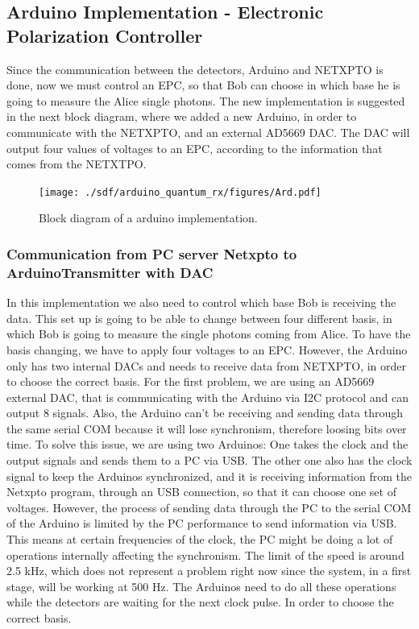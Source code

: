 \begin{refsection}
	
	\clearpage
	
	\subsection{Arduino Implementation - Electronic Polarization Controller }
	Since the communication between the detectors, Arduino and NETXPTO is done, now we must control an EPC, so that Bob can choose in which base he is going to measure the Alice single photons. The new implementation is suggested in the next block diagram, where we added a new Arduino, in order to communicate with the NETXPTO, and an external AD5669 DAC. The DAC will output four values of voltages to an EPC, according to the information that comes from the NETXTPO.
	
	\begin{figure}[H] 
		\centering
		\texttt{[image: ./sdf/arduino\_quantum\_rx/figures/Ard.pdf]}
		\caption{Block diagram of a arduino implementation.}
		\label{fig:netxpto}
		
	\end{figure}

	

	\subsubsection{Communication from PC server Netxpto to ArduinoTransmitter with DAC}
		In this implementation we also need to control which base Bob is receiving the data. This set up is going to be able to change between four different basis, in which Bob is going to measure the single photons coming from Alice. To have the basis changing, we have to apply four voltages to an EPC. However, the Arduino only has two internal DACs and needs to receive data from NETXPTO, in order to choose the correct basis. For the first problem, we are using an AD5669 external DAC, that is communicating with the Arduino via I2C protocol and can output 8 signals. Also, the Arduino can't be receiving and sending data through the same serial COM because it will lose synchronism, therefore loosing bits over time. To solve this issue, we are using two Arduinos: One takes the clock and the output signals and sends them to a PC via USB. The other one also has the clock signal to keep the Arduinos synchronized, and it is receiving information from the Netxpto program, through an USB connection, so that it can choose one set of voltages. However, the process of sending data through the PC to the serial COM of the Arduino is limited by the PC performance to send information via USB. This means at certain frequencies of the clock, the PC might be doing a lot of operations internally affecting the synchronism. The limit of the speed is around 2.5 kHz, which does not represent a problem right now since the system, in a first stage, will be working at 500 Hz. The Arduinos need to do all these operations while the detectors are waiting for the next clock pulse. In order to choose the correct basis.
	

\end{refsection}
